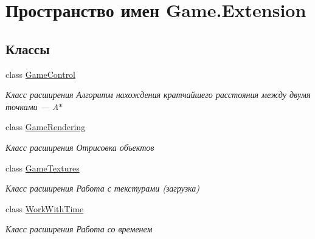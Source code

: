 \hypertarget{namespace_game_1_1_extension}{}\section{Пространство имен Game.\+Extension}
\label{namespace_game_1_1_extension}
\subsection*{Классы}
\begin{DoxyCompactItemize}
\item 
class \hyperlink{class_game_1_1_extension_1_1_game_control}{Game\+Control}
\begin{DoxyCompactList}\small\item\em Класс расширения Алгоритм нахождения кратчайшего расстояния между двумя точками — A$\ast$ \end{DoxyCompactList}\item 
class \hyperlink{class_game_1_1_extension_1_1_game_rendering}{Game\+Rendering}
\begin{DoxyCompactList}\small\item\em Класс расширения Отрисовка объектов \end{DoxyCompactList}\item 
class \hyperlink{class_game_1_1_extension_1_1_game_textures}{Game\+Textures}
\begin{DoxyCompactList}\small\item\em Класс расширения Работа с текстурами (загрузка) \end{DoxyCompactList}\item 
class \hyperlink{class_game_1_1_extension_1_1_work_with_time}{Work\+With\+Time}
\begin{DoxyCompactList}\small\item\em Класс расширения Работа со временем \end{DoxyCompactList}\end{DoxyCompactItemize}
